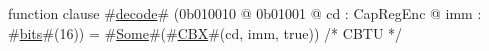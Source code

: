 function clause #\hyperref[zdecode]{decode}# (0b010010 @ 0b01001 @ cd : CapRegEnc @ imm : #\hyperref[zbits]{bits}#(16)) = #\hyperref[zSome]{Some}#(#\hyperref[zCBX]{CBX}#(cd, imm, true))  /* CBTU */
